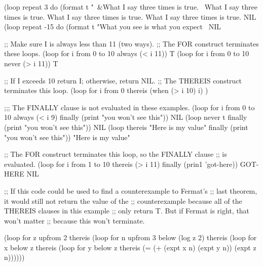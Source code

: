  
\code
 (loop repeat 3
       do (format t "~&What I say three times is true.~%
\OUT What I say three times is true.
\OUT What I say three times is true.
\OUT What I say three times is true.
\EV NIL
 (loop repeat -15
   do (format t "What you see is what you expect~%
\EV NIL
\endcode
 
\endsubsubsection%


\code
;; Make sure I is always less than 11 (two ways).
;; The FOR construct terminates these loops.
 (loop for i from 0 to 10
       always (< i 11))
\EV T
 (loop for i from 0 to 10
       never (> i 11))
\EV T
 
;; If I exceeds 10 return I; otherwise, return NIL.
;; The THEREIS construct terminates this loop.
 (loop for i from 0
       thereis (when (> i 10) i) )

;;; The FINALLY clause is not evaluated in these examples.
 (loop for i from 0 to 10
       always (< i 9)
       finally (print "you won't see this"))
\EV NIL
 (loop never t
       finally (print "you won't see this"))
\EV NIL
 (loop thereis "Here is my value"
       finally (print "you won't see this"))
\EV "Here is my value"
 
;; The FOR construct terminates this loop, so the FINALLY clause 
;; is evaluated.
 (loop for i from 1 to 10
       thereis (> i 11)
       finally (prin1 'got-here))
\OUT GOT-HERE
\EV NIL
 
;; If this code could be used to find a counterexample to Fermat's
;; last theorem, it would still not return the value of the
;; counterexample because all of the THEREIS clauses in this example
;; only return T.  But if Fermat is right, that won't matter
;; because this won't terminate.
 
 (loop for z upfrom 2
       thereis
         (loop for n upfrom 3 below (log z 2)
               thereis
                 (loop for x below z
                       thereis
                         (loop for y below z
                               thereis (= (+ (expt x n) (expt y n))
                                          (expt z n))))))
\endcode

\endsubsubsection%


